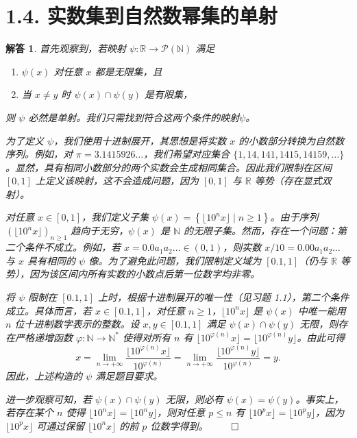 \documentclass[12pt,UTF8]{ctexbook}
\theoremstyle{exercisestyle}
\theoremstyle{solutionstyle}
\newtheorem*{solution*}{解答}
\newenvironment{solution}
  {\begin{solution*}}
  {\hfill\ensuremath{\qed}\end{solution*}}
\begin{document}
\section{1.4. 实数集到自然数幂集的单射}
\begin{solution}
首先观察到，若映射 $\psi : \mathbb{R} \to \mathcal{P}(\mathbb{N})$ 满足 
\begin{enumerate}[label=\arabic*.]
    \item $\psi(x)$ 对任意 $x$ 都是无限集，且
    \item 当 $x \neq y$ 时 $\psi(x) \cap \psi(y)$ 是有限集，
\end{enumerate}
则 $\psi$ 必然是单射。我们只需找到符合这两个条件的映射$\psi$。

为了定义 $\psi$，我们使用十进制展开，其思想是将实数 $x$ 的小数部分转换为自然数序列。例如，对 $\pi = 3.1415926\ldots$，我们希望对应集合 $\{1, 14, 141, 1415, 14159, \ldots\}$。显然，具有相同小数部分的两个实数会生成相同集合。因此我们限制在区间 $[0, 1]$ 上定义该映射，这不会造成问题，因为 $[0,1]$ 与 $\mathbb{R}$ 等势（存在显式双射）。

对任意 $x \in [0,1]$，我们定义子集 $\psi(x) = \left\{ \lfloor10^n x\rfloor \mid n \geq 1 \right\}$。由于序列 $(\lfloor10^n x\rfloor)_{n \geq 1}$ 趋向于无穷，$\psi(x)$ 是 $\mathbb{N}$ 的无限子集。然而，存在一个问题：第二个条件不成立。例如，若 $x = 0.0a_1a_2\ldots \in (0,1)$，则实数 $x/10 = 0.00a_1a_2\ldots$ 与 $x$ 具有相同的 $\psi$ 像。为了避免此问题，我们限制定义域为 $[0.1, 1]$（仍与 $\mathbb{R}$ 等势），因为该区间内所有实数的小数点后第一位数字均非零。

将 $\psi$ 限制在 $[0.1, 1]$ 上时，根据十进制展开的唯一性（见习题 1.1），第二个条件成立。具体而言，若 $x \in [0.1, 1]$，对任意 $n \geq 1$，$\lfloor10^n x\rfloor$ 是 $\psi(x)$ 中唯一能用 $n$ 位十进制数字表示的整数。设 $x, y \in [0.1, 1]$ 满足 $\psi(x) \cap \psi(y)$ 无限，则存在严格递增函数 $\varphi : \mathbb{N} \to \mathbb{N}^*$ 使得对所有 $n$ 有 $\lfloor10^{\varphi(n)}x\rfloor = \lfloor10^{\varphi(n)}y\rfloor$。由此可得
$$
x = \lim_{n \to +\infty} \frac{\lfloor10^{\varphi(n)}x\rfloor}{10^{\varphi(n)}} = \lim_{n \to +\infty} \frac{\lfloor10^{\varphi(n)}y\rfloor}{10^{\varphi(n)}} = y.
$$
因此，上述构造的 $\psi$ 满足题目要求。

进一步观察可知，若 $\psi(x) \cap \psi(y)$ 无限，则必有 $\psi(x) = \psi(y)$。事实上，若存在某个 $n$ 使得 $\lfloor10^n x\rfloor = \lfloor10^n y\rfloor$，则对任意 $p \leq n$ 有 $\lfloor10^p x\rfloor = \lfloor10^p y\rfloor$，因为 $\lfloor10^p x\rfloor$ 可通过保留 $\lfloor10^n x\rfloor$ 的前 $p$ 位数字得到。
\end{solution}
\end{document}
